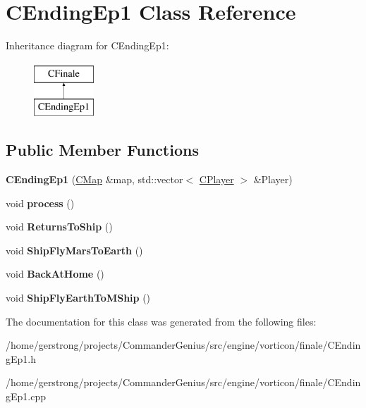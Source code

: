\hypertarget{class_c_ending_ep1}{
\section{CEndingEp1 Class Reference}
\label{class_c_ending_ep1}
}
Inheritance diagram for CEndingEp1:\begin{figure}[H]
\begin{center}
\leavevmode
\includegraphics[height=2cm]{class_c_ending_ep1}
\end{center}
\end{figure}
\subsection*{Public Member Functions}
\begin{DoxyCompactItemize}
\item 
\hypertarget{class_c_ending_ep1_a62a60c3608be1d2c16c0c66aa51e8691}{
{\bfseries CEndingEp1} (\hyperlink{class_c_map}{CMap} \&map, std::vector$<$ \hyperlink{class_c_player}{CPlayer} $>$ \&Player)}
\label{class_c_ending_ep1_a62a60c3608be1d2c16c0c66aa51e8691}

\item 
\hypertarget{class_c_ending_ep1_a45f129c1035c62bddf54e2260309f35d}{
void {\bfseries process} ()}
\label{class_c_ending_ep1_a45f129c1035c62bddf54e2260309f35d}

\item 
\hypertarget{class_c_ending_ep1_a93997a54277fabba4cc2a06da15742bd}{
void {\bfseries ReturnsToShip} ()}
\label{class_c_ending_ep1_a93997a54277fabba4cc2a06da15742bd}

\item 
\hypertarget{class_c_ending_ep1_ac890d9ac388e93b6f13aa42011570b9c}{
void {\bfseries ShipFlyMarsToEarth} ()}
\label{class_c_ending_ep1_ac890d9ac388e93b6f13aa42011570b9c}

\item 
\hypertarget{class_c_ending_ep1_a77ab68c3806b1f87bf7c05febb361a14}{
void {\bfseries BackAtHome} ()}
\label{class_c_ending_ep1_a77ab68c3806b1f87bf7c05febb361a14}

\item 
\hypertarget{class_c_ending_ep1_ae248c89bad6ae747288b766938c17264}{
void {\bfseries ShipFlyEarthToMShip} ()}
\label{class_c_ending_ep1_ae248c89bad6ae747288b766938c17264}

\end{DoxyCompactItemize}


The documentation for this class was generated from the following files:\begin{DoxyCompactItemize}
\item 
/home/gerstrong/projects/CommanderGenius/src/engine/vorticon/finale/CEndingEp1.h\item 
/home/gerstrong/projects/CommanderGenius/src/engine/vorticon/finale/CEndingEp1.cpp\end{DoxyCompactItemize}
